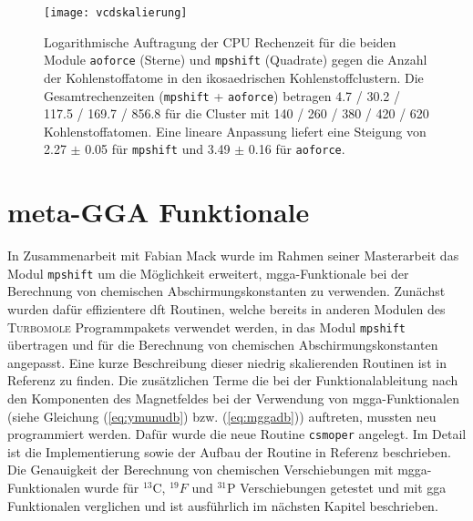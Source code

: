 \begin{figure}[ht!]
	\centering
	\texttt{[image: vcdskalierung]}
	\captionsetup{figurewithin = chapter}
	\captionsetup{font=small, labelfont=bf}\caption[Skalierung von \texttt{mpshift} und \texttt{aoforce}]{ Logarithmische Auftragung der CPU Rechenzeit für die beiden Module \texttt{aoforce} (Sterne) und \texttt{mpshift} (Quadrate) gegen die Anzahl der Kohlenstoffatome in den ikosaedrischen Kohlenstoffclustern. Die Gesamtrechenzeiten (\texttt{mpshift} + \texttt{aoforce}) betragen 4.7 / 30.2 / 117.5 / 169.7 / 856.8 für die Cluster mit 140 / 260 / 380 / 420 / 620 Kohlenstoffatomen. Eine lineare Anpassung liefert eine Steigung von 2.27 $\pm$ 0.05 für \texttt{mpshift} und 3.49 $\pm$ 0.16 für \texttt{aoforce}.}
\label{abb:vcdskalierung}
\end{figure}
	
\section{meta-GGA Funktionale}\label{kap:mgga}
In Zusammenarbeit mit Fabian Mack wurde im Rahmen seiner Masterarbeit das Modul \texttt{mpshift} um die Möglichkeit erweitert, \ac{mgga}-Funktionale bei der Berechnung von chemischen Abschirmungskonstanten zu verwenden. Zunächst wurden dafür effizientere \ac{dft} Routinen, welche bereits in anderen Modulen des \textsc{Turbomole} Programmpakets verwendet werden, in das Modul \texttt{mpshift} übertragen und für die Berechnung von chemischen Abschirmungskonstanten angepasst. Eine kurze Beschreibung dieser niedrig skalierenden Routinen ist in Referenz \cite{deglmann2002efficient} zu finden. Die zusätzlichen Terme die bei der Funktionalableitung nach den Komponenten des Magnetfeldes bei der Verwendung von \ac{mgga}-Funktionalen (siehe Gleichung (\ref{eq:ymunudb}) bzw. (\ref{eq:mggadb})) auftreten, mussten neu programmiert werden. Dafür wurde die neue Routine \texttt{csmoper} angelegt. Im Detail ist die Implementierung sowie der Aufbau der Routine in Referenz \cite{mack2017} beschrieben. Die Genauigkeit der Berechnung von chemischen Verschiebungen mit \ac{mgga}-Funktionalen wurde für $^{13}$C, $^{19}F$ und $^{31}$P Verschiebungen getestet und mit \ac{gga} Funktionalen verglichen\supercite{reiter2017calculation} und ist ausführlich im nächsten Kapitel beschrieben.
	
	